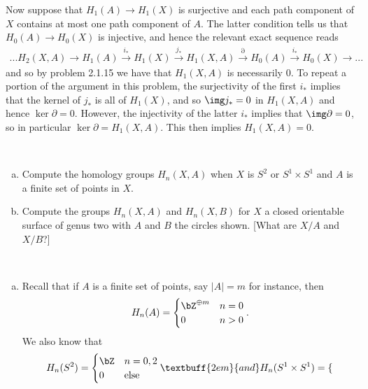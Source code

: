 \begin{homework}[e]
\begin{prf}
\begin{enumerate}[(a)]
        Now suppose that $H_1(A)\to H_1(X)$ is surjective and each path component of $X$ contains at most one path component of $A$. The latter condition tells us that $H_0(A)\to H_0(X)$ is injective, and hence the relevant exact sequence reads
        \begin{align*}
          ... H_2(X,A) \to H_1(A) \xrightarrow{i_*} H_1(X) \xrightarrow{j_*} H_1(X,A) \xrightarrow{\partial} H_0(A) \xrightarrow{i_*} H_0(X) \to ...
        \end{align*}
        and so by problem 2.1.15 we have that $H_1(X,A)$ is necessarily $0$. To repeat a portion of the argument in this problem, the surjectivity of the first $i_*$ implies that the kernel of $j_*$ is all of $H_1(X)$, and so $\img j_* = 0$ in $H_1(X,A)$ and hence $\ker \partial = 0$. However, the injectivity of the latter $i_*$ implies that $\img \partial = 0$, so in particular $\ker \partial = H_1(X,A)$. This then implies $H_1(X,A) = 0$.
    \end{enumerate}
  \end{prf}
  $ $
  \begin{enumerate}[(a)]
    \item Compute the homology groups $H_n(X,A)$ when $X$ is $S^2$ or $S^1\times S^1$ and $A$ is a finite set of points in $X$.
    \item Compute the groups $H_n(X,A)$ and $H_n(X,B)$ for $X$ a closed orientable surface of genus two with $A$ and $B$ the circles shown. [What are $X/A$ and $X/B$?]
  \end{enumerate}
  \begin{prf}$ $
    \begin{enumerate}[(a)]
    \item Recall that if $A$ is a finite set of points, say $|A| = m$ for instance, then
      \begin{align*}
        H_n(A) =
        \begin{cases}
          \bZ^{\oplus m} & n = 0 \\
          0 & n > 0
        \end{cases}.
      \end{align*}
      We also know that
      \begin{align*}
        H_n(S^2) =
        \begin{cases}
          \bZ &n = 0,2 \\
          0 & \text{else}
        \end{cases}
        \textbuff{2em}{and}
        H_n(S^1\times S^1) =
        \begin{cases}

\end{cases}
\end{align*}
\end{enumerate}
\end{prf}
\end{homework}

